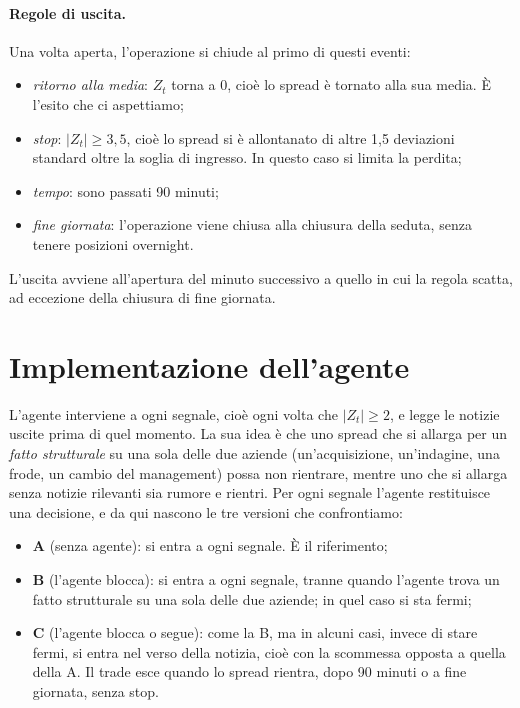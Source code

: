 \documentclass[11pt,a4paper]{article}
\begin{document}
\paragraph{Regole di uscita.} Una volta aperta, l'operazione si chiude al primo di questi eventi:
\begin{itemize}
  \item \emph{ritorno alla media}: $Z_t$ torna a 0, cioè lo spread è tornato alla sua media. È l'esito che ci aspettiamo;
  \item \emph{stop}: $|Z_t| \ge 3{,}5$, cioè lo spread si è allontanato di altre 1,5 deviazioni standard oltre la soglia di ingresso. In questo caso si limita la perdita;
  \item \emph{tempo}: sono passati 90 minuti;
  \item \emph{fine giornata}: l'operazione viene chiusa alla chiusura della seduta, senza tenere posizioni overnight.
\end{itemize}
L'uscita avviene all'apertura del minuto successivo a quello in cui la regola scatta, ad eccezione della chiusura di fine giornata.

\section{Implementazione dell'agente}
L'agente interviene a ogni segnale, cioè ogni volta che $|Z_t| \ge 2$, e legge le notizie uscite prima di quel momento. La sua idea è che uno spread che si allarga per un \emph{fatto strutturale} su una sola delle due aziende (un'acquisizione, un'indagine, una frode, un cambio del management) possa non rientrare, mentre uno che si allarga senza notizie rilevanti sia rumore e rientri. Per ogni segnale l'agente restituisce una decisione, e da qui nascono le tre versioni che confrontiamo:
\begin{itemize}
  \item \textbf{A} (senza agente): si entra a ogni segnale. È il riferimento;
  \item \textbf{B} (l'agente blocca): si entra a ogni segnale, tranne quando l'agente trova un fatto strutturale su una sola delle due aziende; in quel caso si sta fermi;
  \item \textbf{C} (l'agente blocca o segue): come la B, ma in alcuni casi, invece di stare fermi, si entra nel verso della notizia, cioè con la scommessa opposta a quella della A. Il trade esce quando lo spread rientra, dopo 90 minuti o a fine giornata, senza stop.
\end{itemize}
\end{document}

